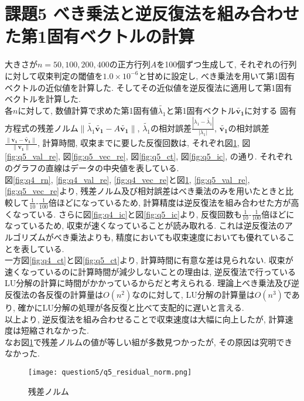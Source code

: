 \documentclass[uplatex,a4j]{jsarticle}
\begin{document}
\section{課題5 べき乗法と逆反復法を組み合わせた第1固有ベクトルの計算}
\label{sec:q5}
大きさが$n = 50,100,200,400$の正方行列$A$を100個ずつ生成して, 
それぞれの行列に対して収束判定の閾値を$1.0 \times 10^{-6}$と甘めに設定し, 
べき乗法を用いて第1固有ベクトルの近似値を計算した. 
そしてその近似値を逆反復法に適用して第1固有ベクトルを計算した. \\
各$n$に対して, 数値計算で求めた第1固有値$\tilde{\lambda_1}$と第1固有ベクトル$\bm{\tilde{v_1}}$に対する
固有方程式の残差ノルム$\| \tilde{\lambda_1}\bm{\tilde{v_1}} - A \bm{\tilde{v_1}} \|$, 
$\tilde{\lambda_1}$の相対誤差$\frac{|\lambda_1 - \tilde{\lambda_1}|}{|\lambda_1|}$, 
$\bm{\tilde{v_1}}$の相対誤差$\frac{\| \bm{v_1} - \bm{\tilde{v_1}} \|}{\| \bm{v_1} \|}$, 
計算時間, 収束までに要した反復回数は, 
それぞれ図\ref{fig:q5_rn}, 図\ref{fig:q5_val_re}, 図\ref{fig:q5_vec_re}, 図\ref{fig:q5_ct}, 図\ref{fig:q5_ic}, の通り. 
それぞれのグラフの直線はデータの中央値を表している. \\
図\ref{fig:q4_rn}, \ref{fig:q4_val_re}, \ref{fig:q4_vec_re}と図\ref{fig:q5_rn}, \ref{fig:q5_val_re}, \ref{fig:q5_vec_re}より, 
残差ノルム及び相対誤差はべき乗法のみを用いたときと比較して$\frac{1}{10}$-$\frac{1}{100}$倍ほどになっているため, 
計算精度は逆反復法を組み合わせた方が高くなっている. 
さらに図\ref{fig:q4_ic}と図\ref{fig:q5_ic}より, 
反復回数も$\frac{1}{10}$-$\frac{1}{100}$倍ほどになっているため, 収束が速くなっていることが読み取れる. 
これは逆反復法のアルゴリズムがべき乗法よりも, 精度においても収束速度においても優れていることを表している. \\
一方図\ref{fig:q4_ct}と図\ref{fig:q5_ct}より, 計算時間に有意な差は見られない. 
収束が速くなっているのに計算時間が減少しないことの理由は, 
逆反復法で行っているLU分解の計算に時間がかかっているからだと考えられる. 
理論上べき乗法及び逆反復法の各反復の計算量は$O(n^2)$なのに対して, LU分解の計算量は$O(n^3)$であり, 
確かにLU分解の処理が各反復と比べて支配的に遅いと言える. \\
以上より, 逆反復法を組み合わせることで収束速度は大幅に向上したが, 計算速度は短縮されなかった. \\
なお図\ref{fig:q5_rn}で残差ノルムの値が等しい組が多数見つかったが, 
その原因は究明できなかった. 

\begin{figure}[ht]
  \centering
  \texttt{[image: question5/q5\_residual\_norm.png]}
  \caption{残差ノルム}
  \label{fig:q5_rn}
\end{figure}
\end{document}
